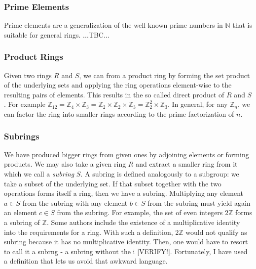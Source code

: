 \subsubsection{Prime Elements}
Prime elements are a generalization of the well known prime numbers in $\mathbb{N}$ that is suitable for general rings. ...TBC...








\subsubsection{Product Rings}
Given two rings $R$ and $S$, we can from a product ring by forming the set product of the underlying sets and applying the ring operations element-wise to the resulting pairs of elements. This results in the so called direct product of $R$ and $S$. For example $\mathbb{Z}_{12} = \mathbb{Z}_4 \times \mathbb{Z}_3 = \mathbb{Z}_2 \times \mathbb{Z}_2 \times \mathbb{Z}_3 = \mathbb{Z}_2^2 \times \mathbb{Z}_3$. In general, for any $\mathbb{Z}_n$, we can factor the ring into smaller rings according to the prime factorization of $n$.


\subsubsection{Subrings}
We have produced bigger rings from given ones by adjoining elements or forming products. We may also take a given ring $R$ and extract a smaller ring from it which we call a \emph{subring} $S$. A subring is defined analogously to a subgroup: we take a subset of the underlying set. If that subset together with the two operations forms itself a ring, then we have a subring. Multiplying any element $a \in S$ from the subring with any element $b \in S$ from the subring must yield again an element $c \in S$ from the subring. For example, the set of even integers $2 \mathbb{Z}$ forms a subring of $\mathbb{Z}$. Some authors include the existence of a multiplicative identity into the requirements for a ring. With such a definition, $2 \mathbb{Z}$ would not qualify as subring because it has no multiplicative identity. Then, one would have to resort to call it a subrng - a subring without the i [VERIFY!]. Fortunately, I have used a definition that lets us avoid that awkward language.

